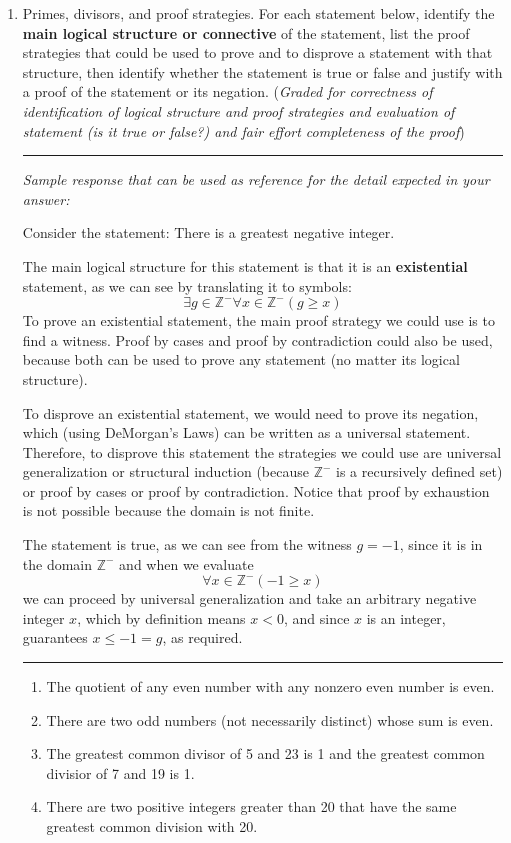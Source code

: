 \documentclass[12pt, oneside]{article}
\begin{document}
\begin{enumerate}[labelindent=0pt, leftmargin=0pt]
    \item Primes, divisors, and proof strategies. For each statement below, identify the {\bf main logical structure or connective} of the 
    statement, list the proof strategies that could be used to prove and to disprove a statement with that structure, 
    then identify whether the statement is true or false and justify with a proof of the statement or its negation. 
    ({\it Graded for correctness of identification of logical structure and proof strategies and evaluation of statement (is it true or false?) 
    and fair effort completeness of the proof}) 


    \rule{0.5\textwidth}{.4pt}
    
    {\it Sample response that can be used as reference for the detail expected 
    in your answer:} 

    Consider the statement: There is a greatest negative integer.

    The main logical structure for this statement is that it is an {\bf existential} statement, as we can 
    see by translating it to symbols: 
    \[
        \exists g \in \mathbb{Z}^{-} \forall x \in \mathbb{Z}^{-} ( g \geq x)
    \]
    To prove an existential statement, the main proof strategy we could use is to find a witness. 
    Proof by cases and proof by contradiction could also be used, because 
    both can be used to prove any statement (no matter its logical structure).

    To disprove an existential statement, we would need to prove its negation, which (using DeMorgan's Laws) can be 
    written as a universal statement. Therefore, to disprove this statement the strategies we could use are 
    universal generalization or structural induction (because $\mathbb{Z}^{-}$ is a recursively defined set) or 
    proof by cases or proof by contradiction. Notice that proof by exhaustion is not possible because the domain is not finite.

    The statement is true, as we can see from the witness $g = -1$, since it is in the domain $\mathbb{Z}^{-}$ and when we evaluate
    \[
        \forall x \in \mathbb{Z}^{-} ( -1 \geq x)
    \]
    we can proceed by universal generalization and take an arbitrary negative integer $x$, which by definition means $x < 0$, 
    and since $x$ is an integer, guarantees $x \leq -1 = g$, as required.
    \rule{0.5\textwidth}{.4pt}

        \begin{enumerate}
            \item The quotient of any even number with any nonzero even number is even.
            \item There are two odd numbers (not necessarily distinct) whose sum is even.
            \item The greatest common divisor of 5 and 23 is 1 and the greatest common divisior of 7 and 19 is 1.
            \item There are two positive integers greater than 20 that have the same greatest common division with 20.
        \end{enumerate}
    \end{enumerate}
\end{document}
